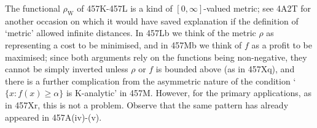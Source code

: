 {The functional $\rho_{\text{W}}$ of 457K-457L
is a kind of $[0,\infty]$-valued metric;  see
4A2T for another occasion on which it would have saved explanation if the
definition of `metric' allowed infinite distances.   In 457Lb we think of
the metric $\rho$ as representing a cost to be minimised, and in 457Mb we
think of $f$ as a profit to be maximised;  since both arguments rely on the
functions being non-negative, they cannot be simply
inverted unless $\rho$ or $f$ is bounded above (as in 457Xq), and there
is a further complication from the asymmetric nature of the condition
`$\{x:f(x)\ge\alpha\}$ is K-analytic' in 457M.   However, for the primary
applications, as in 457Xr, this is not a problem.   Observe that the same
pattern has already appeared in 457A(iv)-(v).
}%

\discrpage

